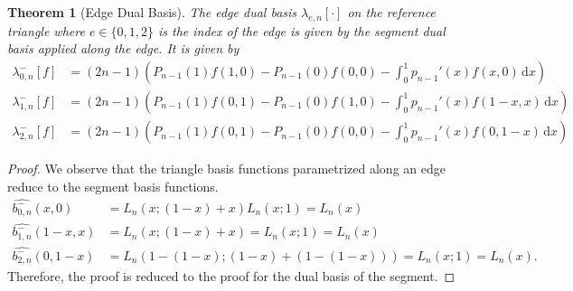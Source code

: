 \documentclass[10pt,a4paper]{article}
\newtheorem{thm}{Theorem}
\begin{document}
    \begin{thm}[Edge Dual Basis]
        The edge dual basis $\lambda_{e,n}[\cdot]$ on the reference triangle where $e \in \{0,1,2\}$ is the index of the edge is given by the segment dual basis applied along the edge. It is given by
        \begin{align*}
            \lambda_{0,n}^{-}[f] &= (2n-1)\left( P_{n-1}(1)f(1,0) - P_{n-1}(0)f(0,0) - \int_0^1\! p_{n-1}'(x)f(x,0) \,\mathrm{d}x \right) \\
            \lambda_{1,n}^{-}[f] &= (2n-1)\left( P_{n-1}(1)f(0,1) - P_{n-1}(0)f(1,0) - \int_0^1\! p_{n-1}'(x)f(1-x,x) \,\mathrm{d}x \right) \\
            \lambda_{2,n}^{-}[f] &= (2n-1)\left( P_{n-1}(1)f(0,1) - P_{n-1}(0)f(0,0) - \int_0^1\! p_{n-1}'(x)f(0,1-x) \,\mathrm{d}x \right)
        \end{align*}
    \end{thm}
    \begin{proof}
        We observe that the triangle basis functions parametrized along an edge reduce to the segment basis functions.
        \begin{align*}
            \widehat{b_{0,n}^{-}}(x,0) &= L_n(x;(1-x)+x) L_n(x;1) = L_n(x) \\
            \widehat{b_{1,n}^{-}}(1-x,x) &= L_n(x;(1-x)+x) = L_n(x;1) = L_n(x) \\
            \widehat{b_{2,n}^{-}}(0,1-x) &= L_n(1-(1-x);(1-x)+(1-(1-x))) = L_n(x;1) = L_n(x).
        \end{align*}
        Therefore, the proof is reduced to the proof for the dual basis of the segment.
    \end{proof}
\end{document}
